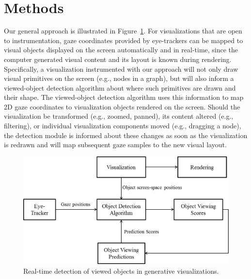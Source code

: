 \section{Methods}\label{sec:Methods}
%
%
Our general approach is illustrated in Figure~\ref{fig:systemBlockDiagram}. For visualizations that are open to instrumentation, gaze coordinates provided by eye-trackers can be mapped to visual objects displayed on the screen automatically and in real-time, since the computer generated visual content and its layout is known during rendering.  Specifically, a visualization instrumented with our approach will not only draw visual primitives on the screen (e.g., nodes in a graph), but will also inform a viewed-object detection algorithm about where such primitives are drawn and their shape. The viewed-object detection algorithm uses this information to map 2D gaze coordinates to visualization objects rendered on the screen. Should the visualization be transformed (e.g., zoomed, panned), its content altered (e.g., filtering), or individual visualization components moved (e.g., dragging a node), the detection module is informed about these changes as soon as the visualization is redrawn and will map subsequent gaze samples to the new visual layout. 

\begin{figure}[htb]
  \centering
  \includegraphics[width=\linewidth]{images/systemBlockDiagram.eps}
  \caption{Real-time detection of viewed objects in generative visualizations.}
	\label{fig:systemBlockDiagram}
\end{figure}

